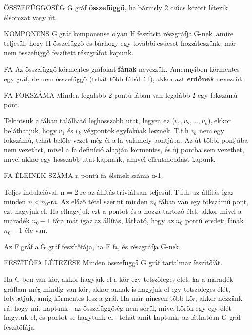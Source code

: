 \begin{definicio}{ÖSSZEFÜGGŐSÉG}
G gráf \textbf{összefüggő}, ha bármely 2 csúcs között létezik élsorozat vagy út.
\end{definicio}

\begin{definicio}{KOMPONENS}
G gráf komponense olyan H feszített részgráfja G-nek, amire teljesül, hogy H összefüggő és bárhogy egy további csúcsot hozzáteszünk, már nem összefüggő feszített részgráfot kapunk.
\end{definicio}

\begin{definicio}{FA}
Az összefüggő körmentes gráfokat \textbf{fának} nevezzük. Amennyiben körmentes egy gráf, de nem összefüggő (tehát több fából áll), akkor azt \textbf{erdőnek} nevezzük.
\end{definicio}

\begin{tetel}{FA FOKSZÁMA}
Minden legalább 2 pontú fában van legalább 2 egy fokszámú pont.
\end{tetel}

\begin{bizonyitas}{}
Tekintsük a fában található leghosszabb utat, legyen ez ($v_1, v_2,..., v_k$), ekkor beláthatjuk, hogy $v_1$ és $v_k$ végpontok egyfokúak lesznek. T.f.h $v_k$ nem egy fokszámú, tehát belőle vezet még él a fa valamely pontjába. Az út többi pontjába nem vezethet, mivel a fa definíció alapján körmentes, és új pontba sem vezethet, mivel akkor egy hosszabb utat kapnánk, amivel ellentmondást kapunk.
\end{bizonyitas}

\begin{tetel}{FA ÉLEINEK SZÁMA}
n pontú fa éleinek száma n-1.
\end{tetel}

\begin{bizonyitas}{}
Teljes indukcióval. n = 2-re az állítás triviálisan teljesül. T.f.h. az állítás igaz minden $n < n_0$-ra. Az előző tétel szerint minden $n_0$ fában van egy fokszámú pont, ezt hagyjuk el. Ha elhagyjuk ezt a pontot és a hozzá tartozó élet, akkor mivel a maradék $n_0 - 1$ fára már igaz az állítás, látható, hogy az $n_0$ pontú eredeti fának $n_0 - 1$ éle van.
\end{bizonyitas}

\begin{definicio}{Az F gráf a G gráf feszítőfája, ha F fa, és részgráfja G-nek.}
\end{definicio}

\begin{tetel}{FESZÍTŐFA LÉTEZÉSE}
Minden összefüggő G gráf tartalmaz feszítőfát.
\end{tetel}

\begin{bizonyitas}{}
Ha G-ben van kör, akkor hagyjuk el a kör egy tetszőleges élét, ha a maradék gráfban még mindig van kör, akkor annak is hagyjuk el egy tetszőleges élét, folytatjuk, amíg körmentes lesz a gráf. Ha már nincsen több kör, akkor nézzünk rá, hogy mit kaptunk - az összefüggőség nem sérül, mivel körök egy-egy élét hagytuk el, és pontot se hagytunk el - tehát amit kaptunk, az láthatóan G gráf feszítőfája.
\end{bizonyitas}
